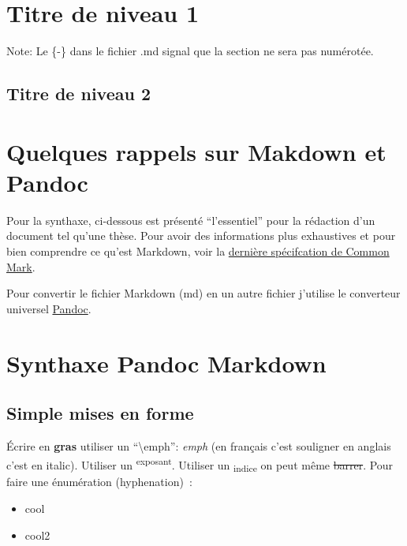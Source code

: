 \section*{Titre de niveau 1}\label{titre-de-niveau-1}

Note: Le \{-\} dans le fichier .md signal que la section ne sera pas
numérotée.

\subsection*{Titre de niveau 2}\label{titre-de-niveau-2}

\section{Quelques rappels sur Makdown et
Pandoc}\label{quelques-rappels-sur-makdown-et-pandoc}

Pour la synthaxe, ci-dessous est présenté ``l'essentiel'' pour la
rédaction d'un document tel qu'une thèse. Pour avoir des informations
plus exhaustives et pour bien comprendre ce qu'est Markdown, voir la
\href{http://spec.commonmark.org/0.25/}{dernière spécifcation de Common
Mark}.

Pour convertir le fichier Markdown (md) en un autre fichier j'utilise le
converteur universel \href{http://pandoc.org}{Pandoc}.

\section*{Synthaxe Pandoc Markdown}\label{synthaxe-pandoc-markdown}

\subsection*{Simple mises en forme}\label{simple-mises-en-forme}

Écrire en \textbf{gras} utiliser un ``\textbackslash{}emph'':
\emph{emph} (en français c'est souligner en anglais c'est en italic).
Utiliser un \textsuperscript{exposant}. Utiliser un
\textsubscript{indice} on peut même \sout{barrer}. Pour faire une
énumération (hyphenation)~:

\begin{itemize}
\tightlist
\item
  cool
\item
  cool2
\end{itemize}

